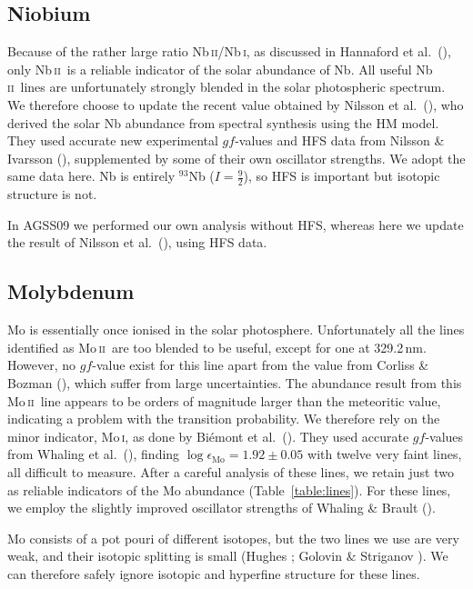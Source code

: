 \documentclass[traditabstract]{aa}
\newcommand{\altnbi}{Nb\,\textsc{i}}
\newcommand{\altnbii}{Nb\,\textsc{ii}}
\newcommand{\altmoi}{Mo\,\textsc{i}}
\newcommand{\altmoii}{Mo\,\textsc{ii}}
\newcommand{\nbii}{\altnbii\ }
\newcommand{\moii}{\altmoii\ }
\begin{document}
\subsection{Niobium}
Because of the rather large ratio \altnbii/\altnbi, as discussed in
Hannaford et al.\ (\cite{hann2}), only \nbii is a reliable indicator
of the solar abundance of Nb.  All useful \nbii lines are unfortunately strongly blended 
in the solar photospheric spectrum.  We therefore choose to update the recent value obtained 
by Nilsson et al.\ (\cite{nils}), who derived the solar Nb abundance from spectral synthesis
using the HM model.  They used accurate new experimental $gf$-values and HFS data from Nilsson
\& Ivarsson (\cite{nils2}), supplemented by some of their own oscillator strengths.  We adopt 
the same data here.  Nb is entirely $^{93}$Nb ($I=\frac92$), so HFS is important but isotopic 
structure is not.

In AGSS09 we performed our own analysis without HFS, whereas here we update the result of Nilsson et al.\ (\cite{nils}), using HFS data.

\subsection{Molybdenum}
Mo is essentially once ionised in the solar photosphere. Unfortunately all
the lines identified as \moii are too blended to be useful, except for one
at 329.2\,nm. However, no $gf$-value exist for this line apart
from the value from Corliss \& Bozman (\cite{corl}), which suffer from large
uncertainties. The abundance result from this \moii line appears to be
orders of magnitude larger than the meteoritic value, indicating a problem with the transition probability. We therefore
rely on the minor indicator, \altmoi, as done by
Bi\'emont et al.\ (\cite{biem4}).  They used accurate $gf$-values from Whaling
et al.\ (\cite{whal1}), finding $\log\epsilon_{\mathrm{Mo}}=1.92\pm0.05$ with twelve very
faint lines, all difficult to measure. After a careful analysis of
these lines, we retain just two as reliable indicators of the Mo abundance (Table~\ref{table:lines}).
For these lines, we employ the slightly improved oscillator strengths of Whaling \& Brault (\cite{whal2}).

Mo consists of a pot pouri of different isotopes, but the two lines we use are very weak, and their isotopic splitting is 
small (Hughes \cite{Hughes}; Golovin \& Striganov \cite{Golovin}).  We can therefore safely ignore isotopic and hyperfine structure for these lines.
\end{document}
